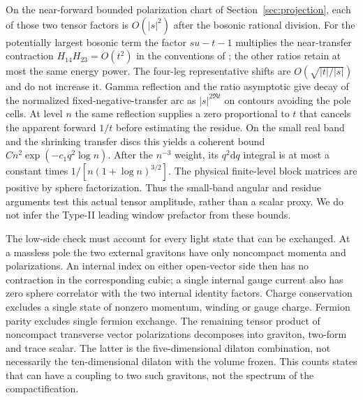 \documentclass[11pt,a4paper]{article}
\theoremstyle{definition}
\theoremstyle{remark}
\newcommand{\dS}{\mathrm{d}}
\begin{document}
On the near-forward bounded polarization chart of Section~\ref{sec:projection}, each of those two tensor factors is $O(|s|^2)$ after the bosonic rational division. For the potentially largest bosonic term the factor $su-t-1$ multiplies the near-transfer contraction $H_{14}H_{23}=O(t^2)$ in the conventions of \cite{CHLi}; the other ratios retain at most the same energy power. The four-leg representative shifts are $O(\sqrt{|t|/|s|})$ and do not increase it. Gamma reflection and the ratio asymptotic give decay of the normalized fixed-negative-transfer arc as $|s|^{2\Re t}$ on contours avoiding the pole cells. At level $n$ the same reflection supplies a zero proportional to $t$ that cancels the apparent forward $1/t$ before estimating the residue. On the small real band and the shrinking transfer discs this yields a coherent bound $C n^2\exp(-c_1 q^2\log n)$. After the $n^{-3}$ weight, its $q^2\dS q$ integral is at most a constant times $1/[n(1+\log n)^{3/2}]$. The physical finite-level block matrices are positive by sphere factorization. Thus the small-band angular and residue arguments test this actual tensor amplitude, rather than a scalar proxy. We do not infer the Type-II leading window prefactor from these bounds.

The low-side check must account for every light state that can be exchanged. At a massless pole the two external gravitons have only noncompact momenta and polarizations. An internal index on either open-vector side then has no contraction in the corresponding cubic; a single internal gauge current also has zero sphere correlator with the two internal identity factors. Charge conservation excludes a single state of nonzero momentum, winding or gauge charge. Fermion parity excludes single fermion exchange. The remaining tensor product of noncompact transverse vector polarizations decomposes into graviton, two-form and trace scalar. The latter is the five-dimensional dilaton combination, not necessarily the ten-dimensional dilaton with the volume frozen. This counts states that can have a coupling to two such gravitons, not the spectrum of the compactification.
\end{document}
